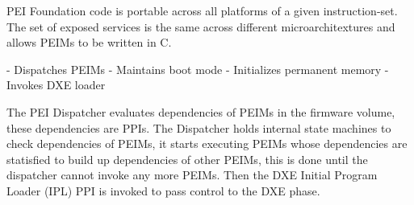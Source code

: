 \begin{enumerate}


    PEI Foundation code is portable across all platforms of a given instruction-set. The set of exposed services is the same across different microarchitextures and allows PEIMs to be written in C.

    - Dispatches PEIMs
    - Maintains boot mode
    - Initializes permanent memory
    - Invokes DXE loader


    The PEI Dispatcher evaluates dependencies of PEIMs in the firmware volume, these dependencies are PPIs. The Dispatcher holds internal state machines to check dependencies of PEIMs, it starts executing PEIMs whose dependencies are statisfied to build up dependencies of other PEIMs, this is done until the dispatcher cannot invoke any more PEIMs. Then the DXE Initial Program Loader (IPL) PPI is invoked to pass control to the DXE phase.


\end{enumerate}
